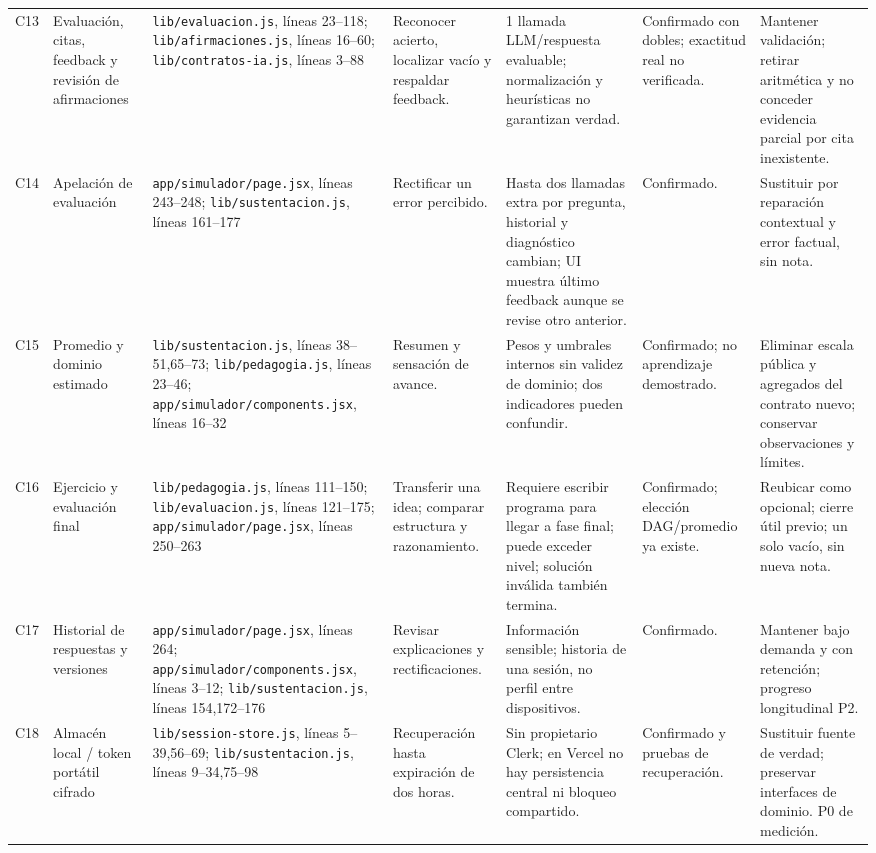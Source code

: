 \documentclass[11pt,a4paper]{report}
\newcommand{\src}[2]{\nolinkurl{#1}, líneas #2}
\begin{document}
\begin{landscape}
\begin{longtable}{P{0.8cm}P{3cm}P{5.1cm}P{4cm}P{3.6cm}P{2.5cm}P{4.4cm}}
C13 & Evaluación, citas, feedback y revisión de afirmaciones & \src{lib/evaluacion.js}{23--118}; \src{lib/afirmaciones.js}{16--60}; \src{lib/contratos-ia.js}{3--88} & Reconocer acierto, localizar vacío y respaldar feedback. & 1 llamada LLM/respuesta evaluable; normalización y heurísticas no garantizan verdad. & Confirmado con dobles; exactitud real no verificada. & Mantener validación; retirar aritmética y no conceder evidencia parcial por cita inexistente.\\
C14 & Apelación de evaluación & \src{app/simulador/page.jsx}{243--248}; \src{lib/sustentacion.js}{161--177} & Rectificar un error percibido. & Hasta dos llamadas extra por pregunta, historial y diagnóstico cambian; UI muestra último feedback aunque se revise otro anterior. & Confirmado. & Sustituir por reparación contextual y error factual, sin nota.\\
C15 & Promedio y dominio estimado & \src{lib/sustentacion.js}{38--51,65--73}; \src{lib/pedagogia.js}{23--46}; \src{app/simulador/components.jsx}{16--32} & Resumen y sensación de avance. & Pesos y umbrales internos sin validez de dominio; dos indicadores pueden confundir. & Confirmado; no aprendizaje demostrado. & Eliminar escala pública y agregados del contrato nuevo; conservar observaciones y límites.\\
C16 & Ejercicio y evaluación final & \src{lib/pedagogia.js}{111--150}; \src{lib/evaluacion.js}{121--175}; \src{app/simulador/page.jsx}{250--263} & Transferir una idea; comparar estructura y razonamiento. & Requiere escribir programa para llegar a fase final; puede exceder nivel; solución inválida también termina. & Confirmado; elección DAG/promedio ya existe. & Reubicar como opcional; cierre útil previo; un solo vacío, sin nueva nota.\\
C17 & Historial de respuestas y versiones & \src{app/simulador/page.jsx}{264}; \src{app/simulador/components.jsx}{3--12}; \src{lib/sustentacion.js}{154,172--176} & Revisar explicaciones y rectificaciones. & Información sensible; historia de una sesión, no perfil entre dispositivos. & Confirmado. & Mantener bajo demanda y con retención; progreso longitudinal P2.\\
C18 & Almacén local / token portátil cifrado & \src{lib/session-store.js}{5--39,56--69}; \src{lib/sustentacion.js}{9--34,75--98} & Recuperación hasta expiración de dos horas. & Sin propietario Clerk; en Vercel no hay persistencia central ni bloqueo compartido. & Confirmado y pruebas de recuperación. & Sustituir fuente de verdad; preservar interfaces de dominio. P0 de medición.\\

\end{longtable}
\end{landscape}
\end{document}
